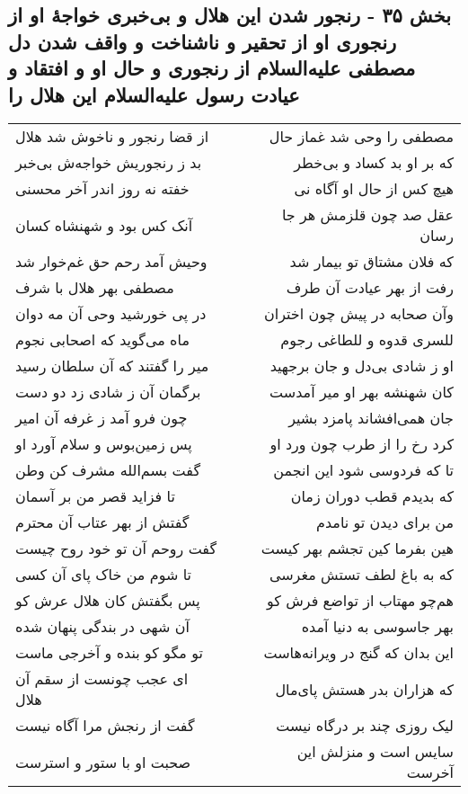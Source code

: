 \begin{center}
\section*{بخش ۳۵ - رنجور شدن این هلال و بی‌خبری خواجهٔ او از رنجوری او از تحقیر و ناشناخت و واقف شدن دل مصطفی علیه‌السلام از رنجوری و حال او و افتقاد و عیادت رسول علیه‌السلام این هلال را}
\label{sec:sh035}
\begin{longtable}{l p{0.5cm} r}
از قضا رنجور و ناخوش شد هلال
&&
مصطفی را وحی شد غماز حال
\\
بد ز رنجوریش خواجه‌ش بی‌خبر
&&
که بر او بد کساد و بی‌خطر
\\
خفته نه روز اندر آخر محسنی
&&
هیچ کس از حال او آگاه نی
\\
آنک کس بود و شهنشاه کسان
&&
عقل صد چون قلزمش هر جا رسان
\\
وحیش آمد رحم حق غم‌خوار شد
&&
که فلان مشتاق تو بیمار شد
\\
مصطفی بهر هلال با شرف
&&
رفت از بهر عیادت آن طرف
\\
در پی خورشید وحی آن مه دوان
&&
وآن صحابه در پیش چون اختران
\\
ماه می‌گوید که اصحابی نجوم
&&
للسری قدوه و للطاغی رجوم
\\
میر را گفتند که آن سلطان رسید
&&
او ز شادی بی‌دل و جان برجهید
\\
برگمان آن ز شادی زد دو دست
&&
کان شهنشه بهر او میر آمدست
\\
چون فرو آمد ز غرفه آن امیر
&&
جان همی‌افشاند پامزد بشیر
\\
پس زمین‌بوس و سلام آورد او
&&
کرد رخ را از طرب چون ورد او
\\
گفت بسم‌الله مشرف کن وطن
&&
تا که فردوسی شود این انجمن
\\
تا فزاید قصر من بر آسمان
&&
که بدیدم قطب دوران زمان
\\
گفتش از بهر عتاب آن محترم
&&
من برای دیدن تو نامدم
\\
گفت روحم آن تو خود روح چیست
&&
هین بفرما کین تجشم بهر کیست
\\
تا شوم من خاک پای آن کسی
&&
که به باغ لطف تستش مغرسی
\\
پس بگفتش کان هلال عرش کو
&&
هم‌چو مهتاب از تواضع فرش کو
\\
آن شهی در بندگی پنهان شده
&&
بهر جاسوسی به دنیا آمده
\\
تو مگو کو بنده و آخرجی ماست
&&
این بدان که گنج در ویرانه‌هاست
\\
ای عجب چونست از سقم آن هلال
&&
که هزاران بدر هستش پای‌مال
\\
گفت از رنجش مرا آگاه نیست
&&
لیک روزی چند بر درگاه نیست
\\
صحبت او با ستور و استرست
&&
سایس است و منزلش این آخرست
\\
\end{longtable}
\end{center}
